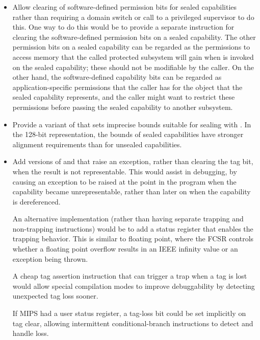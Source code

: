 \begin{itemize}
\item
  Allow clearing of software-defined permission bits for sealed
  capabilities rather than requiring a domain switch or call to a privileged
  supervisor to do this.
  One way to do this would be to provide a separate instruction for clearing
  the software-defined permission bits
  on a sealed capability. The other permission bits on a sealed capability
  can be regarded as the permissions to access memory that the called protected
  subsystem will gain when  is invoked on the sealed
  capability; these should not be modifiable by the caller. On the other hand,
  the software-defined capability bits can be regarded as application-specific
  permissions that the caller has for the object that the sealed capability
  represents, and the caller might want to restrict these permissions before
  passing the sealed capability to another subsystem.

\item
  Provide a variant of  that sets imprecise bounds
  suitable for sealing with . In the 128-bit
  representation, the bounds of sealed capabilities have stronger alignment
  requirements than for unsealed capabilities.

\item
  Add versions of  and 
  that raise an exception, rather than clearing the tag bit, when the result
  is not representable. This would assist in debugging, by causing an
  exception to be raised at the point in the program when the capability
  became unrepresentable, rather than later on when the capability is
  dereferenced.

  An alternative implementation (rather than having separate trapping and
  non-trapping instructions) would be to add a status register that enables
  the trapping behavior. This is similar to floating point, where the
  FCSR controls whether a floating point overflow results in an IEEE
  infinity value or an exception being thrown.

  A cheap tag assertion instruction that can trigger a trap when a tag is lost
  would allow special compilation modes to improve debuggability by detecting
  unexpected tag loss sooner.

  If MIPS had a user status register, a tag-loss bit could be set implicitly
  on tag clear, allowing intermittent conditional-branch instructions to detect
  and handle loss.


\end{itemize}
